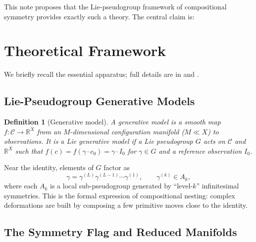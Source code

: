\documentclass[11pt,a4paper]{article}
\newtheorem{definition}{Definition}
\newcommand{\R}{\mathbb{R}}
\newcommand{\cC}{\mathcal{C}}
\begin{document}
This note proposes that the Lie-pseudogroup framework of
compositional symmetry
\citep{Ruffini2025entropy,Ruffini2025compositional}
provides exactly such a theory.
The central claim is:

\medskip
\noindent{}
\medskip

\section{Theoretical Framework}\label{sec:theory}

We briefly recall the essential apparatus;
full details are in \citet{Ruffini2025compositional}
and \citet{Ruffini2025entropy}.

\subsection{Lie-Pseudogroup Generative Models}

\begin{definition}[Generative model]
A generative model is a smooth map
$f:\cC\to\R^X$ from an $M$-dimensional configuration manifold
($M\ll X$) to observations.
It is a \emph{Lie generative model} if a Lie pseudogroup $G$
acts on $\cC$ and $\R^X$ such that
$f(c) = f(\gamma\cdot c_0) = \gamma\cdot I_0$
for $\gamma\in G$ and a reference observation $I_0$.
\end{definition}

Near the identity, elements of $G$ factor as
\begin{equation}\label{eq:factor}
  \gamma = \gamma^{(L)}\gamma^{(L-1)}\cdots\gamma^{(1)},
  \qquad \gamma^{(k)}\in A_k,
\end{equation}
where each $A_k$ is a local sub-pseudogroup generated by
``level-$k$'' infinitesimal symmetries.
This is the formal expression of compositional nesting:
complex deformations are built by composing a few primitive
moves close to the identity.

\subsection{The Symmetry Flag and Reduced Manifolds}
\end{document}
